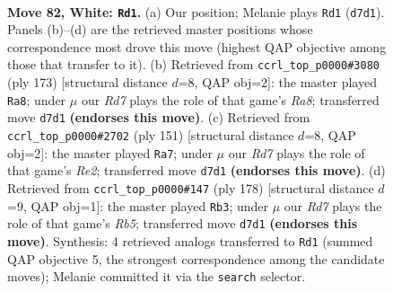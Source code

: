 \documentclass[11pt]{article}
\begin{document}
\clearpage

\begin{figure}[p]\centering
\begin{subfigure}{0.46\textwidth}\centering
\resizebox{\linewidth}{!}{%
\newchessgame
\chessboard[
  setfen={5r1k/P2R4/8/8/8/8/6K1/8 w - - 33 82},
  showmover=false,
  pgfstyle=straightmove, color=movearrow, markmove={d7-d1}
]}
\caption{}
\end{subfigure}\hfill
\begin{subfigure}{0.46\textwidth}\centering
\resizebox{\linewidth}{!}{%
\newchessgame
\chessboard[
  setfen={8/8/4kp2/8/5p2/8/3R2K1/r7 b - - 3 87},
  showmover=false,
  pgfstyle=straightmove, color=movearrow, markmove={a1-a8}
]}
\caption{}
\end{subfigure}
\\[4pt]
\begin{subfigure}{0.46\textwidth}\centering
\resizebox{\linewidth}{!}{%
\newchessgame
\chessboard[
  setfen={8/4r3/2K2R2/6pB/8/7k/8/8 b - - 7 76},
  showmover=false,
  pgfstyle=straightmove, color=movearrow, markmove={e7-a7}
]}
\caption{}
\end{subfigure}\hfill
\begin{subfigure}{0.46\textwidth}\centering
\resizebox{\linewidth}{!}{%
\newchessgame
\chessboard[
  setfen={2k5/8/8/1R6/2r5/8/4K3/8 w - - 10 90},
  showmover=false,
  pgfstyle=straightmove, color=movearrow, markmove={b5-b3}
]}
\caption{}
\end{subfigure}
\caption{\textbf{Move 82, White: \texttt{Rd1}.} (a) Our position; Melanie plays \texttt{Rd1} (\texttt{d7d1}). Panels (b)--(d) are the retrieved master positions whose correspondence most drove this move (highest QAP objective among those that transfer to it). (b) Retrieved from \texttt{ccrl\_top\_p0000\#3080} (ply 173) [structural distance $d$=8, QAP obj=2]: the master played \texttt{Ra8}; under $\mu$ our \emph{Rd7} plays the role of that game's \emph{Ra8}; transferred move \texttt{d7d1} \textbf{(endorses this move)}. (c) Retrieved from \texttt{ccrl\_top\_p0000\#2702} (ply 151) [structural distance $d$=8, QAP obj=2]: the master played \texttt{Ra7}; under $\mu$ our \emph{Rd7} plays the role of that game's \emph{Re2}; transferred move \texttt{d7d1} \textbf{(endorses this move)}. (d) Retrieved from \texttt{ccrl\_top\_p0000\#147} (ply 178) [structural distance $d$=9, QAP obj=1]: the master played \texttt{Rb3}; under $\mu$ our \emph{Rd7} plays the role of that game's \emph{Rb5}; transferred move \texttt{d7d1} \textbf{(endorses this move)}. Synthesis: 4 retrieved analogs transferred to \texttt{Rd1} (summed QAP objective 5, the strongest correspondence among the candidate moves); Melanie committed it via the \texttt{search} selector.}
\label{fig:thought-m162}
\end{figure}
\end{document}
